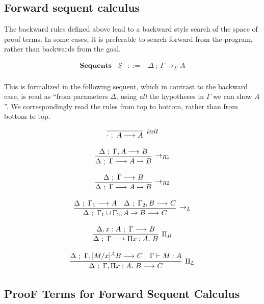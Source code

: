 \documentclass[11pt,twoside]{article}
\begin{document}
\subsection{Forward sequent calculus}

The backward rules defined above lead to a backward style search
of the space of proof terms.  
 In some cases, it is preferable to
search forward from the program, rather than backwards from the
goal. 

\renewcommand{\Sequent}[4][]{#2\ ;\ #3 \longrightarrow_{#1} #4}

$$
\begin{array}{llll}
\mathbf{Sequents} & S & ::= & \Sequent[\Sigma]{\Delta}{\Gamma}{A} \\
\end{array} 
$$

 This is formalized in the following sequent, which in contrast
to the backward case, is read as ``from parameters $\Delta$,
using \emph{all} the hypotheses in $\Gamma$ we can show $A$''.
We correspondingly read the rules from top to bottom, rather
than from bottom to top.

$$
\begin{array}{c}
\infer[init]{\Sequent{\cdot}{A}{A}}{} \\\\
\infer[\LFArr_{R1}]{\Sequent{\Delta}{\Gamma}{A\LFArr B}}
                  {\Sequent{\Delta}{\Gamma,A}{B}} \\\\
\infer[\LFArr_{R2}]{\Sequent{\Delta}{\Gamma}{A\LFArr B}}
                  {\Sequent{\Delta}{\Gamma}{B}} \\\\
\infer[\LFArr_L]{\Sequent{\Delta}{\Gamma_1\cup\Gamma_2,A\LFArr B}{C}}
                {\Sequent{\Delta}{\Gamma_1}{A} & 
                 \Sequent{\Delta}{\Gamma_2,B}{C}}\\\\
\infer[\Pi_R]{\Sequent{\Delta}{\Gamma}{\PiTyp{x}{A}{B}}}
             {\Sequent{\Delta,x:A}{\Gamma}{B}} \\\\
\infer[\Pi_L]{\Sequent{\Delta}{\Gamma,\PiTyp{x}{A}{B}}{C}}
             {\Sequent{\Delta}{\Gamma,\HSub{M}{x}{A}{B}}{C} & 
              \Gamma \vdash M : A}
\end{array} 
$$

\subsection{ProoF Terms for Forward Sequent Calculus}
\end{document}

